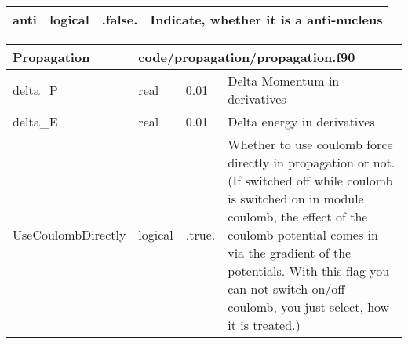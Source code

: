 \documentclass{article}
\begin{document}
\begin{longtable}{llll}
\midrule
anti & \begin{minipage}[t]{2cm}logical\end{minipage} & \begin{minipage}[t]{2cm}.false.\end{minipage} & \begin{minipage}[t]{12cm}Indicate, whether it is a anti-nucleus\end{minipage}\\*
\bottomrule
\end{longtable}
{ }




\begin{longtable}{llll}
\toprule
\textbf{\large{Propagation}} & \multicolumn{3}{l}{\footnotesize{code/propagation/propagation.f90}}\\*
\midrule
\endfirsthead
\midrule
\endhead
delta\_P & \begin{minipage}[t]{2cm}real\end{minipage} & \begin{minipage}[t]{2cm}0.01\end{minipage} & \begin{minipage}[t]{12cm}Delta Momentum in derivatives\end{minipage}\\*
\midrule
delta\_E & \begin{minipage}[t]{2cm}real\end{minipage} & \begin{minipage}[t]{2cm}0.01\end{minipage} & \begin{minipage}[t]{12cm}Delta energy in derivatives\end{minipage}\\*
\midrule
UseCoulombDirectly & \begin{minipage}[t]{2cm}logical\end{minipage} & \begin{minipage}[t]{2cm}.true.\end{minipage} & \begin{minipage}[t]{12cm}Whether to use coulomb force directly in propagation or not. (If switched off while coulomb is switched on in module coulomb, the effect of the coulomb potential comes in via the gradient of the potentials. With this flag you can not switch on/off coulomb, you just select, how it is treated.)\end{minipage}\\*

\end{longtable}
\end{document}
